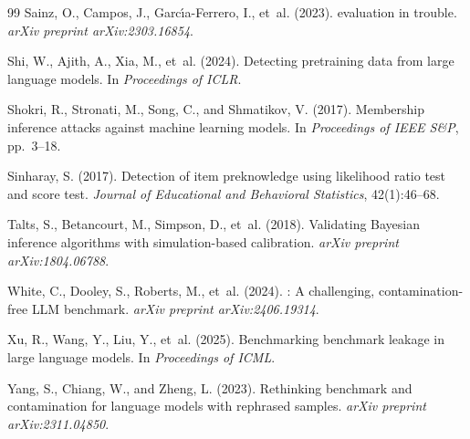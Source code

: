 \documentclass[11pt]{article}
\begin{document}
\begin{thebibliography}{99}
Sainz, O., Campos, J., Garc{\'\i}a-Ferrero, I., et~al. (2023).
 evaluation in trouble.
\newblock \emph{arXiv preprint arXiv:2303.16854}.

Shi, W., Ajith, A., Xia, M., et~al. (2024).
\newblock Detecting pretraining data from large language models.
\newblock In \emph{Proceedings of ICLR}.

Shokri, R., Stronati, M., Song, C., and Shmatikov, V. (2017).
\newblock Membership inference attacks against machine learning models.
\newblock In \emph{Proceedings of IEEE S\&P}, pp.~3--18.

Sinharay, S. (2017).
\newblock Detection of item preknowledge using likelihood ratio test and score test.
\newblock \emph{Journal of Educational and Behavioral Statistics}, 42(1):46--68.

Talts, S., Betancourt, M., Simpson, D., et~al. (2018).
\newblock Validating {Bayesian} inference algorithms with simulation-based calibration.
\newblock \emph{arXiv preprint arXiv:1804.06788}.

White, C., Dooley, S., Roberts, M., et~al. (2024).
: A challenging, contamination-free {LLM} benchmark.
\newblock \emph{arXiv preprint arXiv:2406.19314}.

Xu, R., Wang, Y., Liu, Y., et~al. (2025).
\newblock Benchmarking benchmark leakage in large language models.
\newblock In \emph{Proceedings of ICML}.

Yang, S., Chiang, W., and Zheng, L. (2023).
\newblock Rethinking benchmark and contamination for language models with rephrased samples.
\newblock \emph{arXiv preprint arXiv:2311.04850}.

\end{thebibliography}
\end{document}
